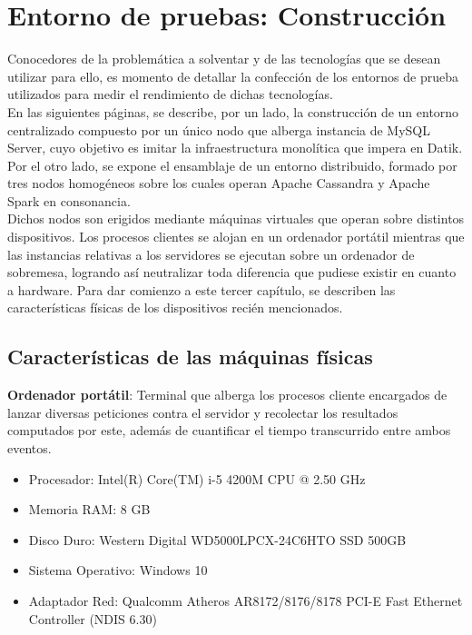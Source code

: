 
\pagestyle{fancy}

\chapter{Entorno de pruebas: Construcción}
\label{entorno_pruebas}

Conocedores de la problemática a solventar y de las tecnologías que se desean utilizar para ello, es momento de detallar la confección de los entornos de prueba utilizados para medir el rendimiento de dichas tecnologías.\\

En las siguientes páginas, se describe, por un lado, la construcción de un entorno centralizado compuesto por un único nodo que alberga instancia de MySQL Server, cuyo objetivo es imitar la infraestructura monolítica que impera en Datik. Por el otro lado, se expone el ensamblaje de un entorno distribuido, formado por tres nodos homogéneos sobre los cuales operan Apache Cassandra y Apache Spark en consonancia.\\

Dichos nodos son erigidos mediante máquinas virtuales que operan sobre distintos dispositivos. Los procesos clientes se alojan en un ordenador portátil mientras que las instancias relativas a los servidores se ejecutan sobre un ordenador de sobremesa, logrando así neutralizar toda diferencia que pudiese existir en cuanto a hardware. Para dar comienzo a este tercer capítulo, se describen las características físicas de los dispositivos recién mencionados.

\clearpage

\section{Características de las máquinas físicas}

\textbf{Ordenador portátil}: Terminal que alberga los procesos cliente encargados de lanzar diversas peticiones contra el servidor y recolectar los resultados computados por este, además de cuantificar el tiempo transcurrido entre ambos eventos.

\begin{itemize}
	\item Procesador: Intel(R) Core(TM) i-5 4200M CPU @ 2.50 GHz
	\item Memoria RAM: 8 GB
	\item Disco Duro: Western Digital WD5000LPCX-24C6HTO SSD 500GB
	\item Sistema Operativo: Windows 10
	\item Adaptador Red: Qualcomm Atheros AR8172/8176/8178 PCI-E Fast Ethernet Controller (NDIS 6.30)
\end{itemize}

